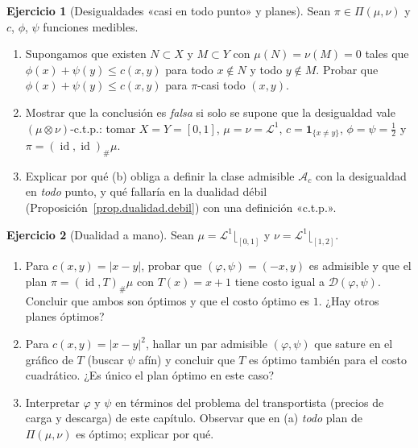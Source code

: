 \documentclass[12pt, a4paper]{amsbook}
\newcommand{\id}{\operatorname{id}}
\newcommand{\D}{{\mathcal D}}
\newcommand{\LL}{{\mathcal L}}
\newcommand{\I}{{\mathbf 1}}
\theoremstyle{remark}
\theoremstyle{definition}
\newtheorem{ejercicio}{Ejercicio}[chapter]
\numberwithin{section}{chapter}
\numberwithin{subsection}{section}
\numberwithin{equation}{section}
\numberwithin{figure}{chapter}
\begin{document}
\begin{ejercicio}[Desigualdades «casi en todo punto» y planes]\label{ejer.ctp.planes}
Sean $\pi\in\Pi(\mu,\nu)$ y $c$, $\phi$, $\psi$ funciones medibles.
\begin{enumerate}[label=(\alph*)]
\item Supongamos que existen $N\subset X$ y $M\subset Y$ con
$\mu(N)=\nu(M)=0$ tales que $\phi(x)+\psi(y)\le c(x,y)$ para todo $x\notin N$
y todo $y\notin M$. Probar que $\phi(x)+\psi(y)\le c(x,y)$ para
$\pi$-casi todo $(x,y)$.
\item Mostrar que la conclusión es \emph{falsa} si solo se supone que la
desigualdad vale $(\mu\otimes\nu)$-c.t.p.: tomar $X=Y=[0,1]$,
$\mu=\nu=\LL^1$, $c=\I_{\{x\ne y\}}$, $\phi=\psi=\tfrac12$ y
$\pi=(\id,\id)_\#\mu$.
\item Explicar por qué (b) obliga a definir la clase admisible
$\mathcal A_c$ con la desigualdad en \emph{todo} punto, y qué fallaría en la
dualidad débil (Proposición~\ref{prop.dualidad.debil}) con una definición
«c.t.p.».
\end{enumerate}
\end{ejercicio}

\begin{ejercicio}[Dualidad a mano]\label{ejer.dualidad.a.mano}
Sean $\mu=\LL^1\lfloor_{[0,1]}$ y $\nu=\LL^1\lfloor_{[1,2]}$.
\begin{enumerate}[label=(\alph*)]
\item Para $c(x,y)=|x-y|$, probar que $(\varphi,\psi)=(-x,y)$ es admisible
y que el plan $\pi=(\id,T)_\#\mu$ con $T(x)=x+1$ tiene costo igual a
$\D(\varphi,\psi)$. Concluir que ambos son óptimos y que el costo óptimo es
$1$. ¿Hay otros planes óptimos?
\item Para $c(x,y)=|x-y|^2$, hallar un par admisible $(\varphi,\psi)$ que
sature en el gráfico de $T$ (buscar $\psi$ afín) y concluir que $T$ es
óptimo también para el costo cuadrático. ¿Es único el plan óptimo en este
caso?
\item Interpretar $\varphi$ y $\psi$ en términos del problema del
transportista (precios de carga y descarga) de este capítulo. Observar que
en (a) \emph{todo} plan de $\Pi(\mu,\nu)$ es óptimo; explicar por qué.
\end{enumerate}
\end{ejercicio}
\end{document}

